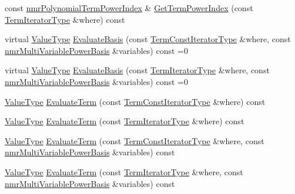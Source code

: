 \begin{DoxyCompactItemize}
\item 
const \hyperlink{classnmr_polynomial_term_power_index}{nmr\+Polynomial\+Term\+Power\+Index} \& \hyperlink{classnmr_polynomial_container_a2143e3ffbe827d4ec643b9fa98da1147}{Get\+Term\+Power\+Index} (const \hyperlink{classnmr_polynomial_container_a276e57445d038e8a16462f47b85719a3}{Term\+Iterator\+Type} \&where) const 
\item 
virtual \hyperlink{classnmr_polynomial_base_a72f0bc16b225e4708bcf15a77ba206e3}{Value\+Type} \hyperlink{classnmr_polynomial_container_ace5c179e6031133fed7602405f0eb56e}{Evaluate\+Basis} (const \hyperlink{classnmr_polynomial_container_aba8d31506ab6a487fdc4fe2815469442}{Term\+Const\+Iterator\+Type} \&where, const \hyperlink{classnmr_multi_variable_power_basis}{nmr\+Multi\+Variable\+Power\+Basis} \&variables) const =0
\item 
virtual \hyperlink{classnmr_polynomial_base_a72f0bc16b225e4708bcf15a77ba206e3}{Value\+Type} \hyperlink{classnmr_polynomial_container_a36281b8ecdc51dfcdac7a373c01ba234}{Evaluate\+Basis} (const \hyperlink{classnmr_polynomial_container_a276e57445d038e8a16462f47b85719a3}{Term\+Iterator\+Type} \&where, const \hyperlink{classnmr_multi_variable_power_basis}{nmr\+Multi\+Variable\+Power\+Basis} \&variables) const =0
\item 
\hyperlink{classnmr_polynomial_base_a72f0bc16b225e4708bcf15a77ba206e3}{Value\+Type} \hyperlink{classnmr_polynomial_container_a8f83a6642b01d0d3ce1df25f9e7c8fc5}{Evaluate\+Term} (const \hyperlink{classnmr_polynomial_container_aba8d31506ab6a487fdc4fe2815469442}{Term\+Const\+Iterator\+Type} \&where) const 
\item 
\hyperlink{classnmr_polynomial_base_a72f0bc16b225e4708bcf15a77ba206e3}{Value\+Type} \hyperlink{classnmr_polynomial_container_abeea4f2120d30716e094613b8cf7ce9e}{Evaluate\+Term} (const \hyperlink{classnmr_polynomial_container_a276e57445d038e8a16462f47b85719a3}{Term\+Iterator\+Type} \&where) const 
\item 
\hyperlink{classnmr_polynomial_base_a72f0bc16b225e4708bcf15a77ba206e3}{Value\+Type} \hyperlink{classnmr_polynomial_container_a35718a7ac77d0753a8ea2f69a3ff0141}{Evaluate\+Term} (const \hyperlink{classnmr_polynomial_container_aba8d31506ab6a487fdc4fe2815469442}{Term\+Const\+Iterator\+Type} \&where, const \hyperlink{classnmr_multi_variable_power_basis}{nmr\+Multi\+Variable\+Power\+Basis} \&variables) const 
\item 
\hyperlink{classnmr_polynomial_base_a72f0bc16b225e4708bcf15a77ba206e3}{Value\+Type} \hyperlink{classnmr_polynomial_container_a75719fb872dc581d1829ef3ea8b2f562}{Evaluate\+Term} (const \hyperlink{classnmr_polynomial_container_a276e57445d038e8a16462f47b85719a3}{Term\+Iterator\+Type} \&where, const \hyperlink{classnmr_multi_variable_power_basis}{nmr\+Multi\+Variable\+Power\+Basis} \&variables) const 

\end{DoxyCompactItemize}
